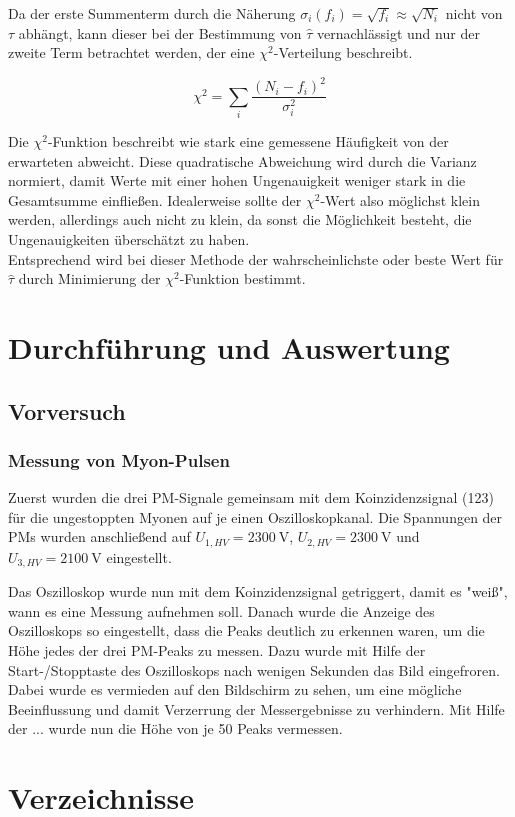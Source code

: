 \documentclass[slug=LM, room=Andreas-Schubert-Bau\,\ K\ 1A,
supervisor=Anne-Sophie\ Berthold, coursedate=13.\ 12.\ 2019]{../../Lab_Report_LaTeX/lab_report}
\begin{document}
Da der erste Summenterm durch die Näherung \(\sigma_i(f_i) = \sqrt{f_i} \approx \sqrt{N_i}\) nicht
von \(\tau\) abhängt, kann dieser bei der Bestimmung von \(\hat{\tau}\) vernachlässigt und nur
der zweite Term betrachtet werden, der eine \(\chi^2\)-Verteilung beschreibt.

\begin{equation}\label{eq:chi}
 \chi^2 = \sum_{i} \frac{(N_i - f_i)^2}{\sigma_i^2}
\end{equation}

Die \(\chi^2\)-Funktion beschreibt wie stark eine gemessene Häufigkeit von der erwarteten abweicht.
Diese quadratische Abweichung wird durch die Varianz normiert, damit Werte mit einer hohen
Ungenauigkeit weniger stark in die Gesamtsumme einfließen. Idealerweise sollte der \(\chi^2\)-Wert
also möglichst klein werden, allerdings auch nicht zu klein, da sonst die Möglichkeit besteht, die
Ungenauigkeiten überschätzt zu haben.\\

Entsprechend wird bei dieser Methode der wahrscheinlichste oder beste Wert für \(\hat\tau\) durch
Minimierung der \(\chi^2\)-Funktion bestimmt.

\section{Durchführung und Auswertung}
\label{sec:ausw}

\subsection{Vorversuch}
\label{sec:vorversuch}

\subsubsection{Messung von Myon-Pulsen}
\label{sec:pulse}

Zuerst wurden die drei PM-Signale gemeinsam mit dem Koinzidenzsignal (123) für die ungestoppten
Myonen auf je einen Oszilloskopkanal. Die Spannungen der PMs wurden anschließend auf
\(U_{1,HV} = \SI{2300}{\volt}\), \(U_{2,HV} = \SI{2300}{\volt}\) und \(U_{3,HV} = \SI{2100}{\volt}\) eingestellt.

Das Oszilloskop wurde nun mit dem Koinzidenzsignal getriggert, damit es "weiß", wann es eine
Messung aufnehmen soll.
Danach wurde die Anzeige des Oszilloskops so eingestellt, dass die Peaks deutlich zu erkennen
waren, um die Höhe jedes der drei PM-Peaks zu messen. Dazu wurde mit Hilfe der Start-/Stopptaste
des Oszilloskops nach wenigen Sekunden das Bild eingefroren. Dabei wurde es vermieden auf den
Bildschirm zu sehen, um eine mögliche Beeinflussung und damit Verzerrung der Messergebnisse zu
verhindern. Mit Hilfe der ... wurde nun die Höhe von je 50 Peaks vermessen.

\section{Verzeichnisse}

\label{sec:literatur}

\listoffigures

\listoftables

\printbibliography
\end{document}
